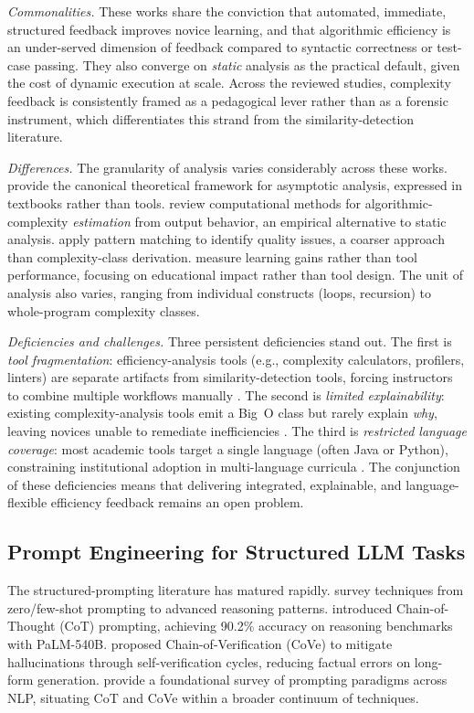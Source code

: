 \documentclass[twocolumn,11pt]{article}
\begin{document}
    \textit{Commonalities.} These works share the conviction that automated, immediate, structured feedback improves novice learning, and that algorithmic efficiency is an under-served dimension of feedback compared to syntactic correctness or test-case passing. They also converge on \emph{static} analysis as the practical default, given the cost of dynamic execution at scale. Across the reviewed studies, complexity feedback is consistently framed as a pedagogical lever rather than as a forensic instrument, which differentiates this strand from the similarity-detection literature.
     
    \textit{Differences.} The granularity of analysis varies considerably across these works. \citet{cormen2022introduction} provide the canonical theoretical framework for asymptotic analysis, expressed in textbooks rather than tools. \citet{zenil2020review} review computational methods for algorithmic-complexity \emph{estimation} from output behavior, an empirical alternative to static analysis. \citet{keuning2017code} apply pattern matching to identify quality issues, a coarser approach than complexity-class derivation. \citet{malik2022enhancing} measure learning gains rather than tool performance, focusing on educational impact rather than tool design. The unit of analysis also varies, ranging from individual constructs (loops, recursion) to whole-program complexity classes.
     
    \textit{Deficiencies and challenges.} Three persistent deficiencies stand out. The first is \emph{tool fragmentation}: efficiency-analysis tools (e.g., complexity calculators, profilers, linters) are separate artifacts from similarity-detection tools, forcing instructors to combine multiple workflows manually \citep{keuning2018systematic}. The second is \emph{limited explainability}: existing complexity-analysis tools emit a Big~O class but rarely explain \emph{why}, leaving novices unable to remediate inefficiencies \citep{malik2022enhancing}. The third is \emph{restricted language coverage}: most academic tools target a single language (often Java or Python), constraining institutional adoption in multi-language curricula \citep{keuning2018systematic,keuning2017code}. The conjunction of these deficiencies means that delivering integrated, explainable, and language-flexible efficiency feedback remains an open problem.
    \subsection{Prompt Engineering for Structured LLM Tasks}
    The structured-prompting literature has matured rapidly. \citet{sahoo2024systematic} survey techniques from zero/few-shot prompting to advanced reasoning patterns. \citet{wei2022chain} introduced Chain-of-Thought (CoT) prompting, achieving 90.2\% accuracy on reasoning benchmarks with PaLM-540B. \citet{dhuliawala2024chain} proposed Chain-of-Verification (CoVe) to mitigate hallucinations through self-verification cycles, reducing factual errors on long-form generation. \citet{liu2023pretrain} provide a foundational survey of prompting paradigms across NLP, situating CoT and CoVe within a broader continuum of techniques.
     
\end{document}
